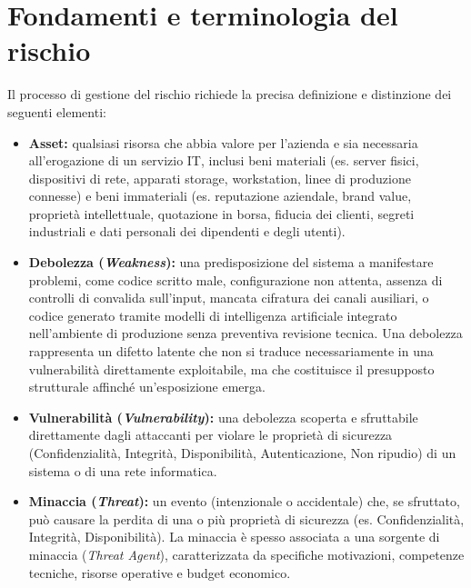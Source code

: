 \documentclass[../../main.tex]{subfiles}
\begin{document}
\section{Fondamenti e terminologia del rischio}
\label{sec:fondamenti_terminologia}

Il processo di gestione del rischio richiede la precisa definizione e distinzione dei seguenti elementi:

\begin{itemize}
    \item \textbf{Asset:} qualsiasi risorsa che abbia valore per l'azienda e sia necessaria all'erogazione di un servizio IT, inclusi beni materiali (es. server fisici, dispositivi di rete, apparati storage, workstation, linee di produzione connesse) e beni immateriali (es. reputazione aziendale, brand value, proprietà intellettuale, quotazione in borsa, fiducia dei clienti, segreti industriali e dati personali dei dipendenti e degli utenti).
    
    \item \textbf{Debolezza (\textit{Weakness}):} una predisposizione del sistema a manifestare problemi, come codice scritto male, configurazione non attenta, assenza di controlli di convalida sull'input, mancata cifratura dei canali ausiliari, o codice generato tramite modelli di intelligenza artificiale integrato nell'ambiente di produzione senza preventiva revisione tecnica. Una debolezza rappresenta un difetto latente che non si traduce necessariamente in una vulnerabilità direttamente exploitabile, ma che costituisce il presupposto strutturale affinché un'esposizione emerga.
    
    \item \textbf{Vulnerabilità (\textit{Vulnerability}):} una debolezza scoperta e sfruttabile direttamente dagli attaccanti per violare le proprietà di sicurezza (Confidenzialità, Integrità, Disponibilità, Autenticazione, Non ripudio) di un sistema o di una rete informatica.
    
    \item \textbf{Minaccia (\textit{Threat}):} un evento (intenzionale o accidentale) che, se sfruttato, può causare la perdita di una o più proprietà di sicurezza (es. Confidenzialità, Integrità, Disponibilità). La minaccia è spesso associata a una sorgente di minaccia (\textit{Threat Agent}), caratterizzata da specifiche motivazioni, competenze tecniche, risorse operative e budget economico.
    

\end{itemize}
\end{document}
